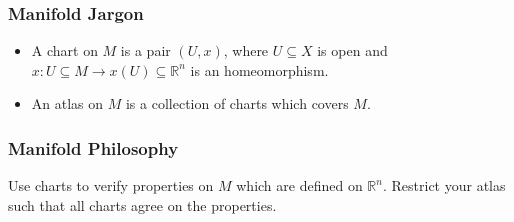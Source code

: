 \documentclass{beamer}
\begin{document}
\begin{frame}

\frametitle{Manifold Jargon}

\begin{itemize}

\item A chart on $M$ is a pair $(U,x)$, where $U\subseteq X$ is open and $x:U\subseteq M\rightarrow x(U)\subseteq\mathbb{R}^n$ is an homeomorphism. 

\item An atlas on $M$ is a collection of charts which covers $M$. 

\end{itemize}

\end{frame}

\begin{frame}[fragile]

\frametitle{Manifold Philosophy}

Use charts to verify properties on $M$ which are defined on $\mathbb{R}^n$. Restrict your atlas such that all charts agree on the properties.


\end{frame}
\end{document}
